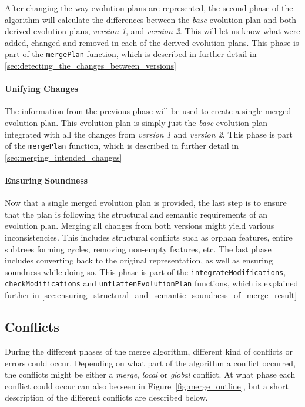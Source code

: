 \documentclass[a4paper,english]{ifimaster}
\begin{document}
After changing the way evolution plans are represented, the second phase of the algorithm will calculate the differences between the \textit{base} evolution plan and both derived evolution plans, \textit{version 1}, and \textit{version 2}. This will let us know what were added, changed and removed in each of the derived evolution plans. This phase is part of the \texttt{mergePlan} function, which is described in further detail in \vref{sec:detecting_the_changes_between_versions}

\paragraph{Unifying Changes}%
\label{par:unifying_changes}

The information from the previous phase will be used to create a single merged evolution plan. This evolution plan is simply just the \textit{base} evolution plan integrated with all the changes from \textit{version 1} and \textit{version 2}. This phase is part of the \texttt{mergePlan} function, which is described in further detail in \vref{sec:merging_intended_changes}

\paragraph{Ensuring Soundness}%
\label{par:ensuring_soundness}

Now that a single merged evolution plan is provided, the last step is to ensure that the plan is following the structural and semantic requirements of an evolution plan. Merging all changes from both versions might yield various inconsistencies. This includes structural conflicts such as orphan features, entire subtrees forming cycles, removing non-empty features, etc. The last phase includes converting back to the original representation, as well as ensuring soundness while doing so. This phase is part of the \texttt{integrateModifications}, \texttt{checkModifications} and \texttt{unflattenEvolutionPlan} functions, which is explained further in \vref{sec:ensuring_structural_and_semantic_soundness_of_merge_result}

\subsection{Conflicts}%
\label{sub:conflicts}

During the different phases of the merge algorithm, different kind of conflicts or errors could occur. Depending on what part of the algorithm a conflict occurred, the conflicts might be either a \textit{merge}, \textit{local} or \textit{global} conflict. At what phase each conflict could occur can also be seen in Figure~\vref{fig:merge_outline}, but a short description of the different conflicts are described below. 
\end{document}

